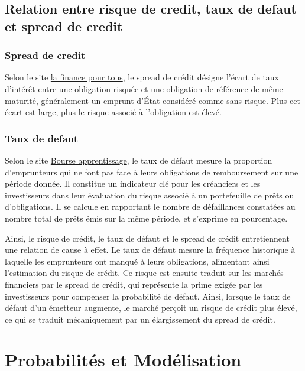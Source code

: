 \section{Relation entre risque de credit, taux de defaut et spread de credit}

\subsection{Spread de credit}
Selon le site \href{https://www.lafinancepourtous.com/outils/dictionnaire/spread-ou-ecart-de-credit/}{la finance pour tous}, le spread de crédit désigne l'écart de taux d'intérêt entre une obligation risquée et une obligation de référence de même maturité, généralement un emprunt d'État considéré comme sans risque. Plus cet écart est large, plus le risque associé à l'obligation est élevé.

\subsection{Taux de defaut}
Selon le site \href{https://www.bourse-apprentissage.com/taux-de-defaut/}{Bourse apprentissage}, le taux de défaut mesure la proportion d'emprunteurs qui ne font pas face à leurs obligations de remboursement sur une période donnée. Il constitue un indicateur clé pour les créanciers et les investisseurs dans leur évaluation du risque associé à un portefeuille de prêts ou d'obligations. Il se calcule en rapportant le nombre de défaillances constatées au nombre total de prêts émis sur la même période, et s'exprime en pourcentage. 

\medskip

Ainsi, le risque de crédit, le taux de défaut et le spread de crédit entretiennent une relation de cause à effet. Le taux de défaut mesure la fréquence historique à laquelle les emprunteurs ont manqué à leurs obligations, alimentant ainsi l'estimation du risque de crédit. Ce risque est ensuite traduit sur les marchés financiers par le spread de crédit, qui représente la prime exigée par les investisseurs pour compenser la probabilité de défaut. Ainsi, lorsque le taux de défaut d'un émetteur augmente, le marché perçoit un risque de crédit plus élevé, ce qui se traduit mécaniquement par un élargissement du spread de crédit.



\chapter{Probabilités et Modélisation}

